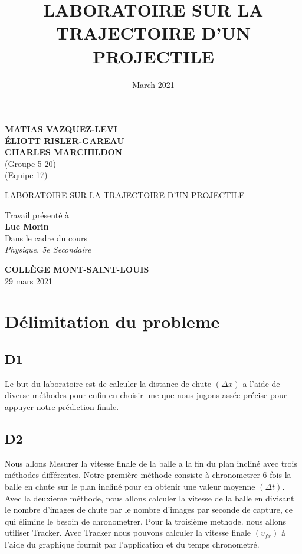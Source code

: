 \documentclass{article}
\title{LABORATOIRE SUR LA TRAJECTOIRE D’UN PROJECTILE}
\date{March 2021}
\begin{document}
    \begin{titlepage}\centering

    \textbf{MATIAS VAZQUEZ-LEVI}\\
    \textbf{ÉLIOTT RISLER-GAREAU}\\
    \textbf{CHARLES MARCHILDON}\\
    \vspace*{1mm}
    (Groupe 5-20)\\
    (Equipe 17)

    \vspace*{55mm}

    \Large LABORATOIRE SUR LA TRAJECTOIRE D’UN PROJECTILE
    \vspace*{40mm}

    Travail présenté à \\
    \textbf{Luc Morin} \\
    Dans le cadre du cours\\
    \emph{Physique. 5e Secondaire}

    \vspace*{30mm}

    \small\textbf{COLLÈGE MONT-SAINT-LOUIS}\\
    29 mars 2021\\


    \end{titlepage}
    \hfill

    \setcounter{section}{1}
    \section{Délimitation du probleme}

        \subsection*{D1}
            Le but du laboratoire est de calculer la distance de chute $(\Delta x)$ a l'aide de diverse méthodes pour enfin en choisir une que nous jugons assée précise pour appuyer notre prédiction finale.


        \subsection*{D2}

            Nous allons Mesurer la vitesse finale de la balle a la fin du plan incliné avec trois méthodes différentes. Notre première méthode consiste à chronometrer 6 fois la balle en chute sur le plan incliné pour en obtenir une valeur moyenne $(\Delta t)$. Avec la deuxieme méthode, nous allons calculer la vitesse de la balle en divisant le nombre d'images de chute par le nombre d'images par seconde de capture, ce qui élimine le besoin de chronometrer. Pour la troisième methode. nous allons utiliser Tracker. Avec Tracker nous pouvons calculer la vitesse finale $(v_{fx})$ à l'aide du graphique fournit par l'application et du temps chronometré.
\end{document}
